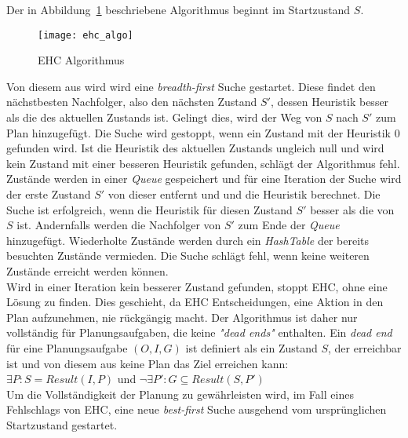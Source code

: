 Der in Abbildung~\ref{fig:ehc_algo} beschriebene Algorithmus beginnt im Startzustand $S$.
\begin{figure}[h!]
           \centering
           \texttt{[image: ehc\_algo]}
           \caption{\acl{EHC} Algorithmus~\cite{hoffmannnebel2001}}
           \label{fig:ehc_algo}
\end{figure}
Von diesem aus wird wird eine \emph{breadth-first} Suche gestartet.
Diese findet den nächstbesten Nachfolger, also den nächsten Zustand $S'$, dessen Heuristik besser als die des aktuellen Zustands ist.
Gelingt dies, wird der Weg von $S$ nach $S'$ zum Plan hinzugefügt.
Die Suche wird gestoppt, wenn ein Zustand mit der Heuristik 0 gefunden wird.
Ist die Heuristik des aktuellen Zustands ungleich null und wird kein Zustand mit einer besseren Heuristik gefunden, schlägt der Algorithmus fehl.
Zustände werden in einer \emph{Queue} gespeichert und für eine Iteration der Suche wird der erste Zustand $S'$ von dieser entfernt und und die Heuristik berechnet.
Die Suche ist erfolgreich, wenn die Heuristik für diesen Zustand $S'$ besser als die von $S$ ist.
Andernfalls werden die Nachfolger von $S'$ zum Ende der \emph{Queue} hinzugefügt.
Wiederholte Zustände werden durch ein \emph{HashTable} der bereits besuchten Zustände vermieden.
Die Suche schlägt fehl, wenn keine weiteren Zustände erreicht werden können.\\
Wird in einer Iteration kein besserer Zustand gefunden, stoppt \ac{EHC}, ohne eine Lösung zu finden.
Dies geschieht, da \ac{EHC} Entscheidungen, eine Aktion in den Plan aufzunehmen, nie rückgängig macht.
Der Algorithmus ist daher nur vollständig für Planungsaufgaben, die keine \emph{"dead ends"} enthalten.
Ein \emph{dead end} für eine Planungsaufgabe $(O,I,G)$ ist definiert als ein Zustand $S$, der erreichbar ist und von diesem aus keine Plan das Ziel erreichen kann:\\
$\exists P: S = Result(I,P)$  und  $\neg\exists P': G\subseteq Result(S,P')$\\
Um die Vollständigkeit der Planung zu gewährleisten wird, im Fall eines Fehlschlags von \ac{EHC}, eine neue \emph{best-first} Suche ausgehend vom ursprünglichen Startzustand gestartet.
